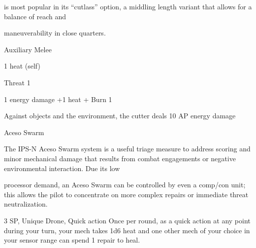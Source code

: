 is most popular in its “cutlass” option, a middling length variant that allows for a balance of reach and

maneuverability in close quarters.


Auxiliary Melee

1 heat (self)

Threat 1

1 energy damage +1 heat + Burn 1

Against objects and the environment, the cutter deals 10 AP energy damage





Aceso Swarm

The IPS-N Aceso Swarm system is a useful triage measure to address scoring and minor mechanical
damage that results from combat engagements or negative environmental interaction. Due its low

processor demand, an Aceso Swarm can be controlled by even a comp/con unit; this allows the pilot to
concentrate on more complex repairs or immediate threat neutralization.

3 SP, Unique
Drone, Quick action
Once per round, as a quick action at any point during your turn, your mech takes 1d6 heat and
one other mech of your choice in your sensor range can spend 1 repair to heal.
